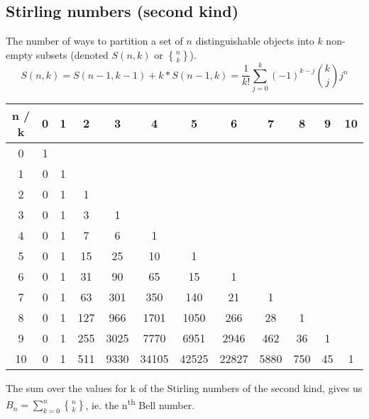 \subsection*{Stirling numbers (second kind)}

The number of ways to partition a set of $n$ distinguishable objects into $k$ non-empty subsets (denoted $S(n, k)$ or $\genfrac{\{}{\}}{0pt}{}{n}{k}$).
$$S(n, k) = S(n-1, k-1) + k*S(n-1, k) = \frac{1}{k!} \sum_{j=0}^k (-1)^{k-j} \binom{k}{j} j^n$$

\begin{center}
    \begin{tabular}{|c|c|c|c|c|c|c|c|c|c|c|c|}
        \hline
        n / k & 0 & 1 & 2 & 3 & 4 & 5 & 6 & 7 & 8 & 9 & 10 \\
        \hline
        0 & 1 & & & & & & & & & & \\
        \hline
        1 & 0 & 1 & & & & & & & & & \\
        \hline
        2 & 0 & 1 & 1 & & & & & & & & \\
        \hline
        3 & 0 & 1 & 3 & 1 & & & & & & & \\
        \hline
        4 & 0 & 1 & 7 & 6 & 1 & & & & & & \\
        \hline
        5 & 0 & 1 & 15 & 25 & 10 & 1 & & & & & \\
        \hline
        6 & 0 & 1 & 31 & 90 & 65 & 15 & 1 & & & & \\
        \hline
        7 & 0 & 1 & 63 & 301 & 350 & 140 & 21 & 1 & & & \\
        \hline
        8 & 0 & 1 & 127 & 966 & 1701 & 1050 & 266 & 28 & 1 & & \\
        \hline
        9 & 0 & 1 & 255 & 3025 & 7770 & 6951 & 2946 & 462 & 36 & 1 & \\
        \hline
        10 & 0 & 1 & 511 & 9330 & 34105 & 42525 & 22827 & 5880 & 750 & 45 & 1 \\
        \hline
    \end{tabular}
\end{center}

The sum over the values for k of the Stirling numbers of the second kind, gives us $\displaystyle B_n = \sum_{k=0}^n \genfrac{\{}{\}}{0pt}{}{n}{k}$, ie. the n\textsuperscript{th} Bell number.


\newpage